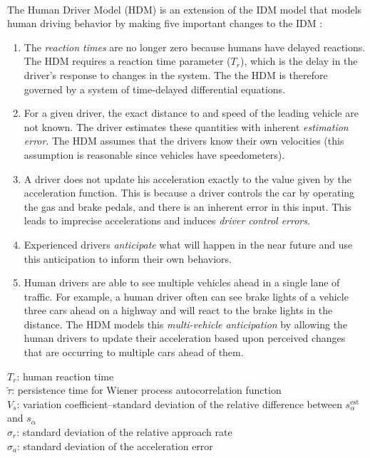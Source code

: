 \documentclass[12pt]{article}
\begin{document}
\paragraph{}
The Human Driver Model (HDM) is an extension of the IDM model that models human driving behavior by making five important changes to the IDM \cite[Chapter~12]{treiber_kesting_2013}:
\begin{enumerate}
  \item The\textit{ reaction times} are no longer zero because humans have delayed reactions.  The HDM requires a reaction time parameter ($T_r$), which is the delay in the driver's response to changes in the system.  The the HDM is therefore governed by a system of time-delayed differential equations.
  \item For a given driver, the exact distance to and speed of the leading vehicle are not known.  The driver estimates these quantities with inherent \textit{estimation error}.  The HDM assumes that the drivers know their own velocities (this assumption is reasonable since vehicles have speedometers).
  \item A driver does not update his acceleration exactly to the value given by the acceleration function.  This is because a driver controls the car by operating the gas and brake pedals, and there is an inherent error in this input. This leads to imprecise accelerations and induces \textit{driver control errors}.
  \item Experienced drivers \textit{anticipate} what will happen in the near future and use this anticipation to inform their own behaviors.
  \item Human drivers are able to see multiple vehicles ahead in a single lane of traffic.  For example, a human driver often can see brake lights of a vehicle three cars ahead on a highway and will react to the brake lights in the distance. The HDM models this \textit{multi-vehicle anticipation} by allowing the human drivers to update their acceleration based upon perceived changes that are occurring to multiple cars ahead of them.
\end{enumerate}
\begin{mymathbox}[title=HDM Parameters,colframe=blue!30!black]
  $T_r$: human reaction time\\
  $\tilde{\tau}$: persistence time for Wiener process autocorrelation function\\
  $V_s$: variation coefficient\---standard deviation of the relative difference between $s_\alpha^\text{est}$ and $s_\alpha$\\
  $\sigma_r$: standard deviation of the relative approach rate\\
  $\sigma_a$: standard deviation of the acceleration error
\end{mymathbox}
\end{document}
